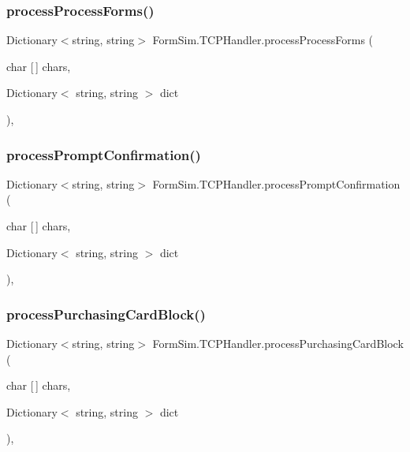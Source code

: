 \subsubsection{\texorpdfstring{process\+Process\+Forms()}{processProcessForms()}}
{\footnotesize\ttfamily Dictionary$<$string, string$>$ Form\+Sim.\+T\+C\+P\+Handler.\+process\+Process\+Forms (\begin{DoxyParamCaption}\item[{char \mbox{[}$\,$\mbox{]}}]{chars,  }\item[{Dictionary$<$ string, string $>$}]{dict }\end{DoxyParamCaption})\hspace{0.3cm}{\ttfamily [inline]}, {\ttfamily [private]}}

\mbox{\label{class_form_sim_1_1_t_c_p_handler_a8514434e5adb697c056d93f73aa849df}} 
\subsubsection{\texorpdfstring{process\+Prompt\+Confirmation()}{processPromptConfirmation()}}
{\footnotesize\ttfamily Dictionary$<$string, string$>$ Form\+Sim.\+T\+C\+P\+Handler.\+process\+Prompt\+Confirmation (\begin{DoxyParamCaption}\item[{char \mbox{[}$\,$\mbox{]}}]{chars,  }\item[{Dictionary$<$ string, string $>$}]{dict }\end{DoxyParamCaption})\hspace{0.3cm}{\ttfamily [inline]}, {\ttfamily [private]}}

\mbox{\label{class_form_sim_1_1_t_c_p_handler_afe54793d0d46b51163edf79a9733d6dd}} 
\subsubsection{\texorpdfstring{process\+Purchasing\+Card\+Block()}{processPurchasingCardBlock()}}
{\footnotesize\ttfamily Dictionary$<$string, string$>$ Form\+Sim.\+T\+C\+P\+Handler.\+process\+Purchasing\+Card\+Block (\begin{DoxyParamCaption}\item[{char \mbox{[}$\,$\mbox{]}}]{chars,  }\item[{Dictionary$<$ string, string $>$}]{dict }\end{DoxyParamCaption})\hspace{0.3cm}{\ttfamily [inline]}, {\ttfamily [private]}}

